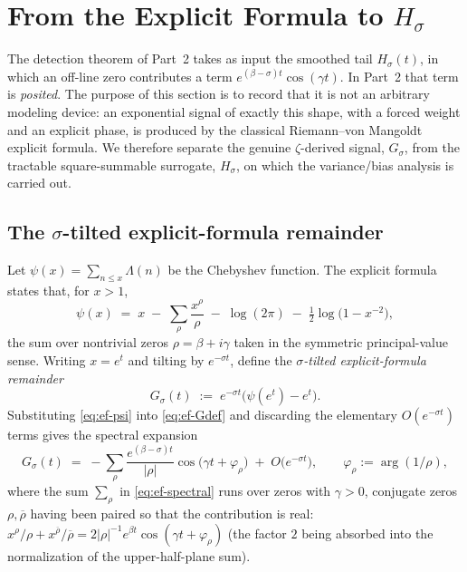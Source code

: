 
\section{From the Explicit Formula to $H_\sigma$}\label{sec:explicit-formula}

The detection theorem of Part~2 takes as input the smoothed tail $H_\sigma(t)$,
in which an off-line zero contributes a term $e^{(\beta-\sigma)t}\cos(\gamma t)$.
In Part~2 that term is \emph{posited}. The purpose of this section is to record
that it is not an arbitrary modeling device: an exponential signal of exactly
this shape, with a forced weight and an explicit phase, is produced by the
classical Riemann--von Mangoldt explicit formula. We therefore separate the
genuine $\zeta$-derived signal, $G_\sigma$, from the tractable square-summable
surrogate, $H_\sigma$, on which the variance/bias analysis is carried out.

\subsection{The $\sigma$-tilted explicit-formula remainder}

Let $\psi(x)=\sum_{n\le x}\Lambda(n)$ be the Chebyshev function. The explicit
formula \cite{titchmarsh,iwaniec-kowalski} states that, for $x>1$,
\begin{equation}
\psi(x) \;=\; x \;-\; \sum_{\rho}\frac{x^{\rho}}{\rho}
        \;-\; \log(2\pi) \;-\; \tfrac12\log\!\bigl(1-x^{-2}\bigr),
\label{eq:ef-psi}
\end{equation}
the sum over nontrivial zeros $\rho=\beta+i\gamma$ taken in the symmetric
principal-value sense. Writing $x=e^{t}$ and tilting by $e^{-\sigma t}$, define
the \emph{$\sigma$-tilted explicit-formula remainder}
\begin{equation}
G_\sigma(t) \;:=\; e^{-\sigma t}\bigl(\psi(e^{t})-e^{t}\bigr).
\label{eq:ef-Gdef}
\end{equation}
Substituting \eqref{eq:ef-psi} into \eqref{eq:ef-Gdef} and discarding the
elementary $O(e^{-\sigma t})$ terms gives the spectral expansion
\begin{equation}
G_\sigma(t) \;=\; -\sum_{\rho}\frac{e^{(\beta-\sigma)t}}{|\rho|}
                 \cos\!\bigl(\gamma t+\varphi_\rho\bigr)\;+\;O\!\bigl(e^{-\sigma t}\bigr),
\qquad \varphi_\rho:=\arg(1/\rho),
\label{eq:ef-spectral}
\end{equation}
where the sum $\sum_\rho$ in \eqref{eq:ef-spectral} runs over zeros with
$\gamma>0$, conjugate zeros $\rho,\overline{\rho}$ having been paired so that the
contribution is real: $x^{\rho}/\rho + x^{\overline{\rho}}/\overline{\rho}
= 2|\rho|^{-1}e^{\beta t}\cos(\gamma t+\varphi_\rho)$ (the factor $2$ being
absorbed into the normalization of the upper-half-plane sum).

